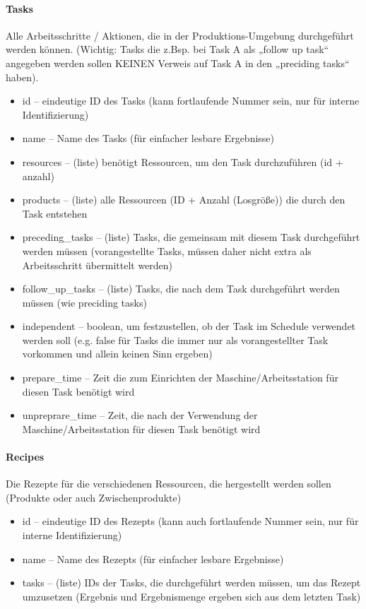 \documentclass[a4paper,12pt,twoside]{scrreprt}
\begin{document}
\paragraph*{Tasks}
Alle Arbeitsschritte / Aktionen, die in der Produktions-Umgebung durchgeführt werden können.
(Wichtig: Tasks die z.Bsp. bei Task A als „follow up task“ angegeben werden sollen KEINEN Verweis auf Task A in den „preciding tasks“ haben).
\begin{itemize}
	\item id – eindeutige ID des Tasks (kann fortlaufende Nummer sein, nur für interne Identifizierung)
	\item name – Name des Tasks (für einfacher lesbare Ergebnisse)
	\item resources – (liste) benötigt Ressourcen, um den Task durchzuführen (id + anzahl)
	\item products – (liste) alle Ressourcen (ID + Anzahl (Losgröße)) die durch den Task entstehen
	\item preceding\_tasks – (liste) Tasks, die gemeinsam mit diesem Task durchgeführt werden müssen (vorangestellte Tasks, müssen daher nicht extra als Arbeitsschritt übermittelt werden)
	\item follow\_up\_tasks – (liste) Tasks, die nach dem Task durchgeführt werden müssen (wie preciding tasks)
	\item independent – boolean, um festzustellen, ob der Task im Schedule verwendet werden soll (e.g. false für Tasks die immer nur als vorangestellter Task vorkommen und allein keinen Sinn ergeben)
	\item prepare\_time – Zeit die zum Einrichten der Maschine/Arbeitsstation für diesen Task benötigt wird
	\item unpreprare\_time – Zeit, die nach der Verwendung der Maschine/Arbeitsstation für diesen Task benötigt wird
\end{itemize}
\paragraph*{Recipes}
Die Rezepte für die verschiedenen Ressourcen, die hergestellt werden sollen (Produkte oder auch Zwischenprodukte)
\begin{itemize}
	\item id – eindeutige ID des Rezepts (kann auch fortlaufende Nummer sein, nur für interne Identifizierung)
	\item name – Name des Rezepts (für einfacher lesbare Ergebnisse)
	\item tasks – (liste) IDs der Tasks, die durchgeführt werden müssen, um das Rezept umzusetzen (Ergebnis und Ergebnismenge ergeben sich aus dem letzten Task)
\end{itemize}
\end{document}

